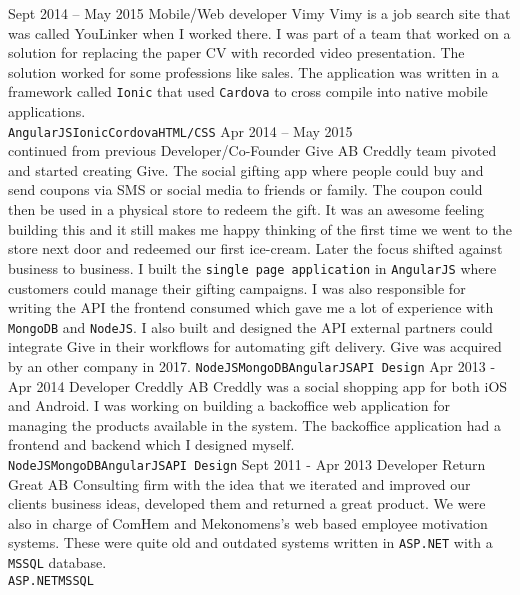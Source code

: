 \documentclass[9pt]{developercv} %
\begin{document}
\begin{entrylist}
  \entry
    {Sept 2014 -- May 2015}
    {Mobile/Web developer}
    {Vimy}
    {Vimy is a job search site that was called YouLinker when I worked there.
      I was part of a team that worked on a solution for replacing the paper CV
      with recorded video presentation. The solution worked for some professions like
      sales. The application was written in a framework called \texttt{Ionic} that
      used \texttt{Cardova} to cross compile into native mobile applications.\\
      \texttt{AngularJS}\slashsep\texttt{Ionic}\slashsep\texttt{Cordova}\slashsep\texttt{HTML/CSS}}
  \entry
    {Apr 2014 -- May 2015\\\footnotesize{continued from previous}}
    {Developer/Co-Founder}
    {Give AB}
    {Creddly team pivoted and started creating Give. The social gifting app where people
      could buy and send coupons via SMS or social media to friends or family.
      The coupon could then be used in a physical store to redeem the gift.
      It was an awesome feeling building this and it still makes me happy thinking of the
      first time we went to the store next door and redeemed our first ice-cream.
      Later the focus shifted against business to business.
      I built the \texttt{single page application} in \texttt{AngularJS} where customers
      could manage their gifting campaigns. I was also responsible for writing the API
      the frontend consumed which gave me a lot of experience with \texttt{MongoDB} and
      \texttt{NodeJS}. I also built and designed the API external partners could
      integrate Give in their workflows for automating gift delivery. Give was acquired
      by an other company in 2017.
      \texttt{NodeJS}\slashsep\texttt{MongoDB}\slashsep\texttt{AngularJS}\slashsep\texttt{API Design}}
  \entry
    {Apr 2013 - Apr 2014}
    {Developer}
    {Creddly AB}
    {Creddly was a social shopping app for both iOS and Android. I was working on building
      a backoffice web application for managing the products available in the system.
      The backoffice application had a frontend and backend which I designed myself.\\
      \texttt{NodeJS}\slashsep\texttt{MongoDB}\slashsep\texttt{AngularJS}\slashsep\texttt{API Design}}
  \entry
    {Sept 2011 - Apr 2013}
    {Developer}
    {Return Great AB}
    {Consulting firm with the idea that we iterated and improved our clients
      business ideas, developed them and returned a great product. We were
      also in charge of ComHem and Mekonomens’s web based employee motivation
      systems. These were quite old and outdated systems written in \texttt{ASP.NET}
      with a \texttt{MSSQL} database.\\
      \texttt{ASP.NET}\slashsep\texttt{MSSQL}}
\end{entrylist}
\end{document}
